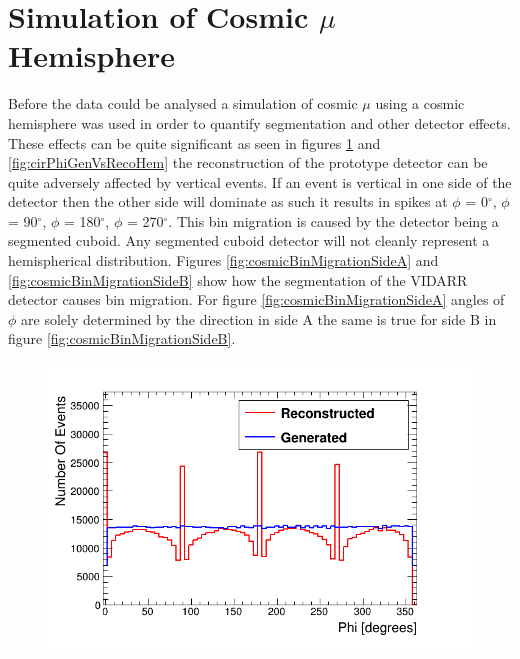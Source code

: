 \section{Simulation of Cosmic $\mu$ Hemisphere}\label{sec:SimulationOfCosmics}
Before the data could be analysed a simulation of cosmic $\mu$ using a cosmic hemisphere was used in order to quantify segmentation and other detector effects. These effects can be quite significant as seen in figures \ref{fig:phiGenVsRecoHem} and \ref{fig:cirPhiGenVsRecoHem} the reconstruction of the prototype detector can be quite adversely affected by vertical events. If an event is vertical in one side of the detector then the other side will dominate as such it results in spikes at $\phi$ = 0$^\circ$, $\phi$ = 90$^\circ$, $\phi$ = 180$^\circ$, $\phi$ = 270$^\circ$. This bin migration is caused by the detector being a segmented cuboid. Any segmented cuboid detector will not cleanly represent a hemispherical distribution. Figures \ref{fig:cosmicBinMigrationSideA} and \ref{fig:cosmicBinMigrationSideB} show how the segmentation of the VIDARR detector causes bin migration. For figure \ref{fig:cosmicBinMigrationSideA} angles of $\phi$ are solely determined by the direction in side A the same is true for side B in figure \ref{fig:cosmicBinMigrationSideB}. 

\begin{figure}[!h]
 \centering
 \includegraphics[width=0.8\linewidth]{Chapter5/Figs/Raster/hemispherePhiCompare.png}
 \label{fig:phiGenVsRecoHem}
\end{figure}


